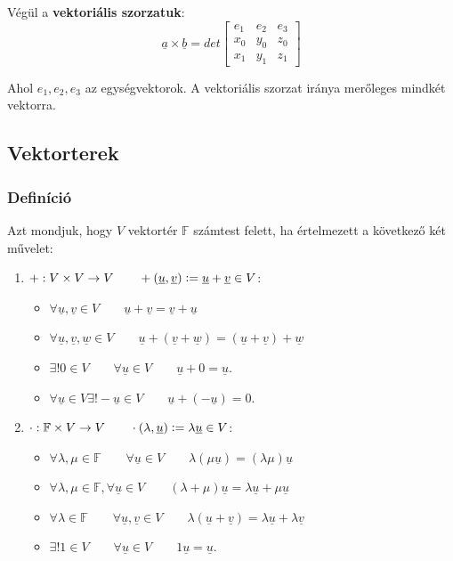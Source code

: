 \documentclass{article}
\begin{document}
Végül a \textbf{vektoriális szorzatuk}:
\begin{equation*}
    \underline{a} \times \underline{b} = det\begin{bmatrix} e_1 & e_2 & e_3 \\ x_0 & y_0 & z_0 \\ x_1 & y_1 & z_1 \end{bmatrix}
\end{equation*}

Ahol $e_1, e_2, e_3$ az egységvektorok. A vektoriális szorzat iránya merőleges mindkét vektorra.

\subsection{Vektorterek}

\subsubsection{Definíció}

Azt mondjuk, hogy $V$ vektortér $\mathbb{F}$ számtest felett, ha értelmezett a következő két művelet:
\begin{enumerate}
\item $+:V\times V\rightarrow V \qquad +\left(\underline{u},\underline{v}\right)\vcentcolon = \underline{u}+\underline{v}\in V$:
\begin{itemize}
\item $\forall \underline{u},\underline{v}\in V \qquad \underline{u}+\underline{v}=\underline{v}+\underline{u}$
\item $\forall \underline{u},\underline{v},\underline{w}\in V \qquad \underline{u}+\left(\underline{v}+\underline{w}\right)=\left(\underline{u}+\underline{v}\right)+\underline{w}$
\item $\exists!0\in V \qquad \forall \underline{u}\in V \qquad \underline{u}+0=\underline{u}$.
\item $\forall \underline{u}\in V \exists!-\underline{u}\in V \qquad  \underline{u}+\left(-\underline{u}\right)=0$.
\end{itemize}
\item $\cdot:\mathbb{F}\times V\rightarrow V \qquad \cdot\left(\lambda,\underline{u}\right)\vcentcolon = \lambda\underline{u}\in V$:
\begin{itemize}
\item $\forall \lambda,\mu\in\mathbb{F}\qquad \forall \underline{u}\in V \qquad \lambda\left(\mu\underline{u}\right)=\left(\lambda\mu\right)\underline{u}$
\item $\forall \lambda,\mu\in\mathbb{F}, \forall \underline{u}\in V \qquad \left(\lambda+\mu\right)\underline{u}=\lambda\underline{u}+\mu\underline{u}$
\item $\forall \lambda\in\mathbb{F}\qquad\forall \underline{u},\underline{v}\in V \qquad \lambda\left(\underline{u}+\underline{v}\right)=\lambda\underline{u}+\lambda\underline{v}$
\item $\exists!1\in V \qquad \forall \underline{u}\in V \qquad 1\underline{u}=\underline{u}$.
\end{itemize}
\end{enumerate}
\end{document}
